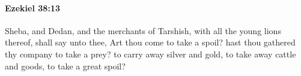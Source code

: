 
		\paragraph{Ezekiel 38:13} %
			\label{EZEKIEL-38-13}

			Sheba, and Dedan, and the merchants of Tarshish, with all the young lions thereof, shall say unto thee, Art thou come to take a spoil? hast thou gathered thy company to take a prey? to carry away silver and gold, to take away cattle and goods, to take a great spoil?


